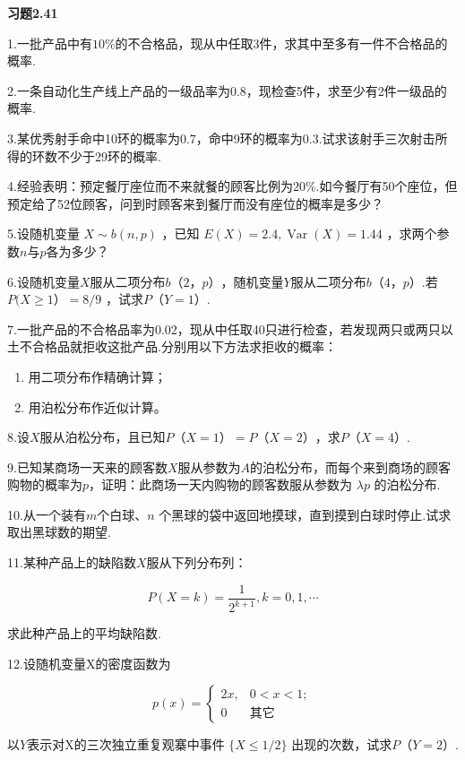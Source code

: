 \begin{center}
	\textbf{习题2.41}
\end{center}

1.一批产品中有$ 10\% $的不合格品，现从中任取3件，求其中至多有一件不合格品的概率.

2.一条自动化生产线上产品的一级品率为0.8，现检查5件，求至少有2件一级品的概率.

3.某优秀射手命中10环的概率为0.7，命中9环的概率为0.3.试求该射手三次射击所得的环数不少于29环的概率.

4.经验表明：预定餐厅座位而不来就餐的顾客比例为$ 20\% $.如今餐厅有50个座位，但预定给了52位顾客，问到时顾客来到餐厅而没有座位的概率是多少？

5.设随机变量 $X \sim b(n, p)$ ，已知 $E(X)=2.4, \operatorname{Var}(X)=1.44$ ，求两个参数$ n $与$ p $各为多少？

6.设随机变量$ X $服从二项分布$ b（2，p） $，随机变量$ Y $服从二项分布$ b（4，p） $.若 $P(X \geqslant 1）=8/9$ ，试求$ P（Y=1） $.

7.一批产品的不合格品率为0.02，现从中任取40只进行检查，若发现两只或两只以土不合格品就拒收这批产品.分别用以下方法求拒收的概率：

\begin{enumerate}
	\item 用二项分布作精确计算；
	\item 用泊松分布作近似计算。
\end{enumerate}

8.设$ X $服从泊松分布，且已知$ P（X=1）=P（X=2） $，求$ P（X=4） $.

9.已知某商场一天来的顾客数$ X $服从参数为$ A $的泊松分布，而每个来到商场的顾客购物的概率为$ p $，证明：此商场一天内购物的顾客数服从参数为 $\lambda p$ 的泊松分布.

10.从一个装有$ m $个白球、$ n $ 个黑球的袋中返回地摸球，直到摸到白球时停止.试求取出黑球数的期望.

11.某种产品上的缺陷数$ X $服从下列分布列：

\[
P(X=k)=\frac{1}{2^{k+1}}, k=0,1, \cdots
\]

求此种产品上的平均缺陷数.

12.设随机变量X的密度函数为

\[
p(x)=\left\{
\begin{array}{ll}
{2 x,} & {0<x<1 ;} \\ 
{0}    & {\text{其它}}
\end{array}
\right.
\]

以$ Y $表示对X的三次独立重复观寨中事件 $ \{X \leqslant 1 / 2\} $ 出现的次数，试求$ P（Y=2） $.

